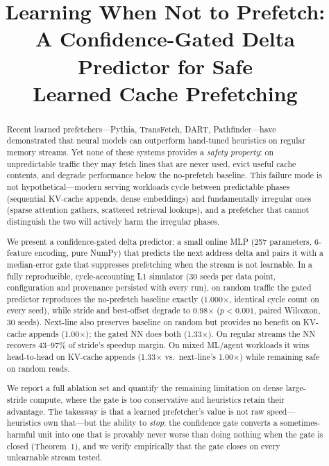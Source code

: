 \documentclass[conference]{IEEEtran}
\begin{document}
\title{Learning When Not to Prefetch:\\A Confidence-Gated Delta Predictor for Safe\\Learned Cache Prefetching}

\author{
\and
{}
}

\maketitle

\begin{abstract}
Recent learned prefetchers---Pythia, TransFetch, DART, Pathfinder---have demonstrated
that neural models can outperform hand-tuned heuristics on regular memory streams.
Yet none of these systems provides a \emph{safety property}: on unpredictable traffic
they may fetch lines that are never used, evict useful cache contents, and degrade
performance below the no-prefetch baseline. This failure mode is not hypothetical---modern
serving workloads cycle between predictable phases (sequential KV-cache appends,
dense embeddings) and fundamentally irregular ones (sparse attention gathers, scattered
retrieval lookups), and a prefetcher that cannot distinguish the two will actively
harm the irregular phases.

We present a confidence-gated delta predictor: a small online MLP (257 parameters,
6-feature encoding, pure NumPy) that predicts the next address delta and pairs it
with a median-error gate that suppresses prefetching when the stream is not learnable.
In a fully reproducible, cycle-accounting L1 simulator (30 seeds per data point,
configuration and provenance persisted with every run), on random traffic the gated predictor reproduces the no-prefetch baseline exactly
(1.000$\times$, identical cycle count on every seed), while stride and best-offset
degrade to 0.98$\times$ ($p < 0.001$, paired Wilcoxon, 30 seeds). Next-line also
preserves baseline on random but provides no benefit on KV-cache appends
(1.00$\times$); the gated NN does both (1.33$\times$). On regular streams the NN
recovers 43--97\% of stride's speedup margin. On mixed ML/agent workloads it wins head-to-head
on KV-cache appends (1.33$\times$ vs.\ next-line's 1.00$\times$) while remaining safe
on random reads.

We report a full ablation set and quantify the remaining limitation on dense
large-stride compute, where the gate is too conservative and heuristics retain their
advantage. The takeaway is that a learned prefetcher's value is not raw speed---heuristics
own that---but the ability to \emph{stop}: the confidence gate converts a sometimes-harmful
unit into one that is provably never worse than doing nothing when the gate is closed
(Theorem~1), and we verify empirically that the gate closes on every unlearnable
stream tested.
\end{abstract}
\end{document}
